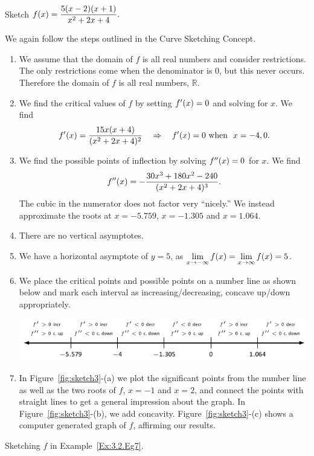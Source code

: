 \begin{example} \label{Ex:3.2.Eg7}
Sketch $\displaystyle f(x) = \frac{5(x-2)(x+1)}{x^2+2x+4}.$

\solution We again follow the steps outlined in the Curve Sketching Concept.
\begin{enumerate}[1)]
\item We assume that the domain of $f$ is all real numbers and consider restrictions. The only restrictions come when the denominator is 0, but this never occurs. Therefore the domain of $f$ is all real numbers, $\mathbb{R}$.
\item We find the critical values of $f$ by setting $f'(x)=0$ and solving for $x$. We find 
$$f'(x) = \frac{15x(x+4)}{(x^2+2x+4)^2} \quad \Rightarrow \quad f'(x) = 0 \text{ when } \ x=-4,0.$$
\item We find the possible points of inflection by solving $f''(x) = 0$ for $x$. We find
$$f''(x) = -\frac{30x^3+180x^2-240}{(x^2+2x+4)^3} .$$ The cubic in the numerator does not factor very ``nicely.'' We instead approximate the roots at $x= -5.759$, $x=-1.305$ and $x=1.064$.
			
\item There are no vertical asymptotes.
\item We have a horizontal asymptote of $y=5$, as $\displaystyle \lim_{x\to-\infty}f(x) = \lim_{x\to\infty}f(x) = 5$.
\item We place the critical points and possible points on a number line as shown below and mark each interval as increasing/decreasing, concave up/down appropriately.
	
\begin{center}
\includegraphics[scale=.75]{figures/figsketchline3}
\end{center}
	
\item In Figure~\ref{fig:sketch3}-(a) we plot the significant points from the number line as well as the two roots of $f$, $x=-1$ and $x=2$, and connect the points with straight lines to get a general impression about the graph. In Figure~\ref{fig:sketch3}-(b), we add concavity. Figure~\ref{fig:sketch3}-(c) shows a computer generated graph of $f$, affirming our results.		
\end{enumerate}
\end{example}

\begin{marginfigure}[-4cm] %


\caption{Sketching $f$ in Example~\ref{Ex:3.2.Eg7}.}
\label{fig:sketch3}
\end{marginfigure}